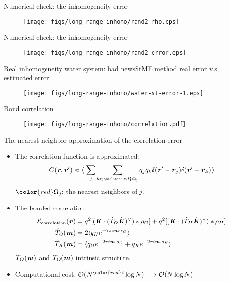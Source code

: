 \documentclass{beamer}
\newcommand{\redc}[1]{{\color{red} #1}}
\newcommand{\bluec}[1]{{\color{blue} #1}}
\newcommand{\vect}[1]{\textbf{\textit{#1}}}
\begin{document}
\begin{frame}{Numerical check: the inhomogeneity error}
  \begin{figure}
    \centering
    \texttt{[image: figs/long-range-inhomo/rand2-rho.eps]}
  \end{figure}
\end{frame}

\begin{frame}{Numerical check: the inhomogeneity error}
  \begin{figure}
    \centering
    \texttt{[image: figs/long-range-inhomo/rand2-error.eps]}
  \end{figure}
\end{frame}

\begin{frame}{Real inhomogeneity water system: bad news}{StME method real error v.s. estimated error}
  \begin{figure}
    \centering
    \texttt{[image: figs/long-range-inhomo/water-st-error-1.eps]}
  \end{figure}  
\end{frame}

\begin{frame}{Bond correlation}
  \begin{figure}
    \centering
    \texttt{[image: figs/long-range-inhomo/correlation.pdf]}
  \end{figure}    
\end{frame}


\begin{frame}{The nearest neighbor approximation of the correlation error}
  \begin{itemize}
  \item <1-> The correlation function is approximated:
    \bluec{
      \begin{align*}
        C(\vect r, \vect r') \approx
        \big\langle \sum_j\sum_{k\in\redc{\Omega_j}} q_jq_k
        \delta (\vect r' - \vect r_j)\delta (\vect r' - \vect r_k)\big\rangle
      \end{align*}
    }
    $\redc{\Omega_j}$: the nearest neighbors of \bluec{$j$}.
    \vfill
  \item <2-> The bonded correlation:
    \bluec{\begin{align*}
        \mathcal E_{\textrm{correlation}}(\vect r) &=
        q^2 [(\vect K\cdot (\hat T_O\hat{\vect K})^\vee) \ast \rho_O]+
        q^2 [(\vect K\cdot (\hat T_H\hat{\vect K})^\vee) \ast \rho_H] \\
        \hat T_O(\vect m) &= 2 \langle q_He^{-2\pi i\vect m\cdot s_O}\rangle\\
        \hat T_H(\vect m) &=
        \langle q_O e^{-2\pi i\vect m\cdot s_O} +
        q_H e^{-2\pi i\vect m\cdot s_H}\rangle
      \end{align*}}
    \bluec{$T_O(\vect m)$}  and  \bluec{$T_O(\vect m)$}  intrinsic structure.
    \vfill
  \item <3-> Computational cost:
    \bluec{$\mathcal O(N^\redc{2}\log N)\longrightarrow \mathcal O(N\log N)$}
  \end{itemize}
\end{frame}
\end{document}
